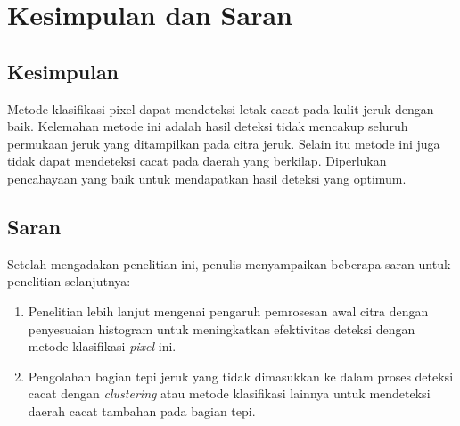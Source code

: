 \documentclass[laporan.tex]{subfiles}
\begin{document}
\chapter{Kesimpulan dan Saran}

\section{Kesimpulan}

Metode klasifikasi pixel dapat mendeteksi letak cacat pada kulit jeruk dengan baik. Kelemahan metode ini adalah hasil deteksi tidak mencakup seluruh permukaan jeruk yang ditampilkan pada citra jeruk. Selain itu metode ini juga tidak dapat mendeteksi cacat pada daerah yang berkilap. Diperlukan pencahayaan yang baik untuk mendapatkan hasil deteksi yang optimum.

\section{Saran}

Setelah mengadakan penelitian ini, penulis menyampaikan beberapa saran untuk penelitian selanjutnya:

\begin{enumerate}
\item Penelitian lebih lanjut mengenai pengaruh pemrosesan awal citra dengan penyesuaian histogram untuk meningkatkan efektivitas deteksi dengan metode klasifikasi \emph{pixel} ini.
\item Pengolahan bagian tepi jeruk yang tidak dimasukkan ke dalam proses deteksi cacat dengan \emph{clustering} atau metode klasifikasi lainnya untuk mendeteksi daerah cacat tambahan pada bagian tepi.
\end{enumerate}
\end{document}
